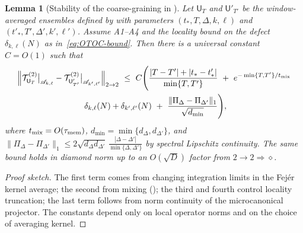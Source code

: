\documentclass[11pt,a4paper]{article}
\theoremstyle{plain}
\newtheorem{lemma}[theorem]{Lemma}
\theoremstyle{definition}
\theoremstyle{remark}
\begin{document}
\begin{lemma}[Stability of the coarse-graining in ]\label{lem:CG-stability}
Let $\mathsf{U}_T$ and $\mathsf{U}'_{T'}$ be the window-averaged ensembles defined by  with parameters
$(t_\ast,T,\Delta,k,\ell)$ and $(t'_\ast,T',\Delta',k',\ell')$. Assume A1--A4 and the locality bound on the defect $\delta_{k,\ell}(N)$
as in~\eqref{eq:OTOC-bound}. Then there is a universal constant $C=O(1)$ such that
\begin{multline}
\left\| \mathcal{T}^{(2)}_{\mathsf{U}_T}\big|_{\mathscr{A}_{k,\ell}} - \mathcal{T}^{(2)}_{\mathsf{U}'_{T'}}\big|_{\mathscr{A}_{k',\ell'}} \right\|_{2\to 2} 
\ \le\ C\Bigg(\frac{|T-T'|+|t_\ast-t'_\ast|}{\min\{T,T'\}} \ +\ e^{-\min\{T,T'\}/t_{\rm mix}} \\
\ \delta_{k,\ell}(N)+\delta_{k',\ell'}(N)\ +\ \frac{\|\Pi_\Delta-\Pi_{\Delta'}\|_1}{\sqrt{d_{\min}}}\Bigg),
\label{eq:CG-stability}
\end{multline}
where $t_{\rm mix}=O(\tau_{\rm mem})$, $d_{\min}=\min\{d_\Delta,d_{\Delta'}\}$, and $\|\Pi_\Delta-\Pi_{\Delta'}\|_1\le 2\sqrt{d_\Delta d_{\Delta'}}\,\frac{|\Delta-\Delta'|}{\min\{\Delta,\Delta'\}}$ by spectral
Lipschitz continuity. The same bound holds in diamond norm up to an $O(\sqrt{D})$ factor from $2{\to}2\Rightarrow\diamond$.
\end{lemma}
\begin{proof}[Proof sketch]
The first term comes from changing integration limits in the Fej\'er kernel average; the second from mixing ();
the third and fourth control locality truncation; the last term follows from norm continuity of the microcanonical projector.
The constants depend only on local operator norms and on the choice of averaging kernel.
\end{proof}
\end{document}
